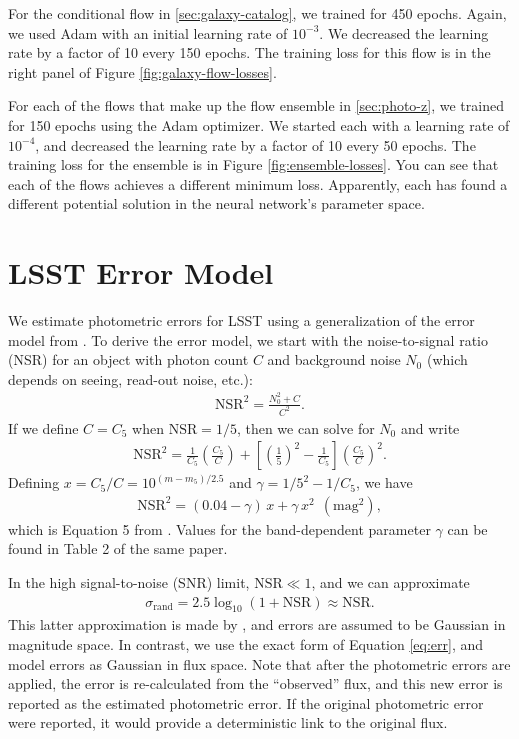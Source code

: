 \documentclass[twocolumn]{aastex631}
\begin{document}
For the conditional flow in \ref{sec:galaxy-catalog}, we trained for 450 epochs.
Again, we used Adam with an initial learning rate of $10^{-3}$.
We decreased the learning rate by a factor of 10 every 150 epochs.
The training loss for this flow is in the right panel of Figure \ref{fig:galaxy-flow-losses}.

For each of the flows that make up the flow ensemble in \ref{sec:photo-z}, we trained for 150 epochs using the Adam optimizer.
We started each with a learning rate of $10^{-4}$, and decreased the learning rate by a factor of 10 every 50 epochs.
The training loss for the ensemble is in Figure \ref{fig:ensemble-losses}.
You can see that each of the flows achieves a different minimum loss.
Apparently, each has found a different potential solution in the neural network's parameter space.


\section{LSST Error Model}
\label{app:error-model}

We estimate photometric errors for LSST using a generalization of the error model from \citet{ivezic2019}.
To derive the error model, we start with the noise-to-signal ratio (NSR) for an object with photon count $C$ and background noise $N_0$ (which depends on seeing, read-out noise, etc.):
\begin{align}
    \text{NSR}^2 = \frac{N_0^2 + C}{C^2}.
\end{align}
If we define $C=C_5$ when $\text{NSR}= 1/5$, then we can solve for $N_0$ and write
\begin{align}
    \text{NSR}^2 = \frac{1}{C_5} \left( \frac{C_5}{C} \right) + \left[ \left( \frac{1}{5} \right)^2 - \frac{1}{C_5} \right] \left( \frac{C_5}{C} \right)^2.
\end{align}
Defining $x = C_5/C = 10^{(m-m_5)/2.5}$ and $\gamma = 1/5^2 - 1/C_5$, we have
\begin{align}
    \text{NSR}^2 = (0.04 - \gamma) \, x + \gamma \, x^2 ~~ (\text{mag}^2),
\end{align}
which is Equation 5 from \citet{ivezic2019}.
Values for the band-dependent parameter $\gamma$ can be found in Table 2 of the same paper.

In the high signal-to-noise (SNR) limit, $\text{NSR} \ll 1$, and we can approximate
\begin{align}
    \sigma_\text{rand} = 2.5 \log_{10}(1 + \text{NSR}) \approx \text{NSR}.
    \label{eq:err}
\end{align}
This latter approximation is made by \citet{ivezic2019}, and errors are assumed to be Gaussian in magnitude space.
In contrast, we use the exact form of Equation \ref{eq:err}, and model errors as Gaussian in flux space.
Note that after the photometric errors are applied, the error is re-calculated from the ``observed'' flux, and this new error is reported as the estimated photometric error.
If the original photometric error were reported, it would provide a deterministic link to the original flux.
\end{document}
